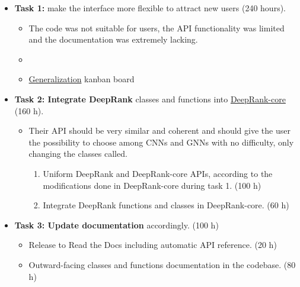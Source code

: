 \begin{itemize}
\item \textbf{Task 1:} make the interface more flexible to attract new users (240 hours).
\begin{itemize}[label=o]
\item The code was not suitable for users, the API functionality was limited and the documentation was
extremely lacking.
\item {}
\item \href{https://github.com/DeepRank/deeprank-core/projects/6}{Generalization} kanban board
\end{itemize}
\end{itemize}



\begin{itemize}
\item \textbf{Task 2: Integrate DeepRank} classes and functions into \href{https://github.com/DeepRank/deeprank-core/blob/class_diagram/deeprankcore/uml/classes_npl.svg}{DeepRank-core}
(160 h).
\begin{itemize}
\item Their API should be very similar and coherent and should give the user the
possibility to choose among CNNs and GNNs with no difficulty, only changing the classes called.
\begin{enumerate}[label=\roman*.]
\item Uniform DeepRank and DeepRank-core APIs, according to the modifications done
in DeepRank-core during task 1. (100 h)
\item Integrate DeepRank functions and classes in DeepRank-core. (60 h)
\end{enumerate}
\end{itemize}
\end{itemize}



\begin{itemize}
\item \textbf{Task 3: Update documentation} accordingly. (100 h)
\begin{itemize}[label=o]
\item Release to Read the Docs including automatic API reference. (20 h)
\item Outward-facing classes and functions documentation in the codebase. (80 h)
\end{itemize}
\end{itemize}




